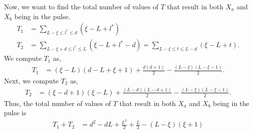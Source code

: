 \documentclass{article}
\begin{document}
Now, we want to find the total number of values of $T$ that result in both $X_a$ and $X_b$ being in the pulse.
\begin{align}
  T_1 
  &= \sum_{ L - \xi \leq l^* \leq d } (\xi - L + l^*) \label{eq:T1} \\
  T_2
  &= \sum_{ L - \xi + d \leq l^* \leq L } (\xi - L + l^* - d)
  = \sum_{ L - \xi \leq t \leq L - d } (\xi - L + t). \label{eq:T2}
\end{align}
We compute $T_1$ as,
\begin{align*}
  T_1
  &= (\xi - L) (d - L + \xi + 1) + \frac{d(d+1)}{2} - \frac{(L-\xi)(L-\xi-1)}{2}.
\end{align*}
Next, we compute $T_2$ as,
\begin{align*}
  T_2
  &= (\xi - d + 1) (\xi - L) + \frac{(L-d)(L-d+1)}{2} - \frac{(L-\xi)(L-\xi-1)}{2}.
\end{align*}
Thus, the total number of values of $T$ that result in both $X_a$ and $X_b$ being in the pulse is
\begin{align*}
  T_1 + T_2
  &= d^2 - dL + \frac{L^2}{2} + \frac{L}{2} - (L-\xi) (\xi+1)
\end{align*}
\end{document}
